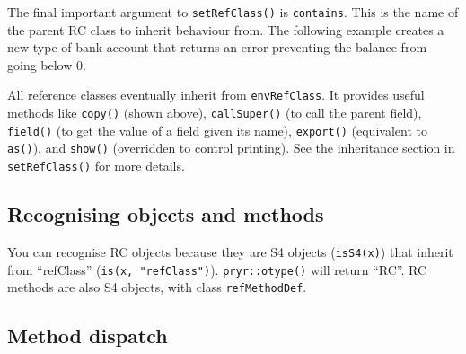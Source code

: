 The final important argument to \texttt{setRefClass()} is
\texttt{contains}. This is the name of the parent RC class to inherit
behaviour from. The following example creates a new type of bank account
that returns an error preventing the balance from going below 0.

\begin{Shaded}
\begin{Highlighting}[]
\StringTok{ }\NormalTok{(}\NormalTok{,}
   \NormalTok{,}
   \NormalTok{(}
     
      \StringTok{ }\NormalTok{(}\NormalTok{)}
      \StringTok{ }\StringTok{ }
    \NormalTok{\}}
  \NormalTok{)}
\NormalTok{)}
\StringTok{ }\NormalTok{(} \NormalTok{)}
\NormalTok{(}\NormalTok{)}
\NormalTok{(}\NormalTok{)}
\end{Highlighting}
\end{Shaded}

All reference classes eventually inherit from \texttt{envRefClass}. It
provides useful methods like \texttt{copy()} (shown above),
\texttt{callSuper()} (to call the parent field), \texttt{field()} (to
get the value of a field given its name), \texttt{export()} (equivalent
to \texttt{as()}), and \texttt{show()} (overridden to control printing).
See the inheritance section in \texttt{setRefClass()} for more details.

\subsection{Recognising objects and methods}

You can recognise RC objects because they are S4 objects
(\texttt{isS4(x)}) that inherit from ``refClass''
(\texttt{is(x, "refClass")}). \texttt{pryr::otype()} will return ``RC''.
RC methods are also S4 objects, with class \texttt{refMethodDef}.

\subsection{Method dispatch}

